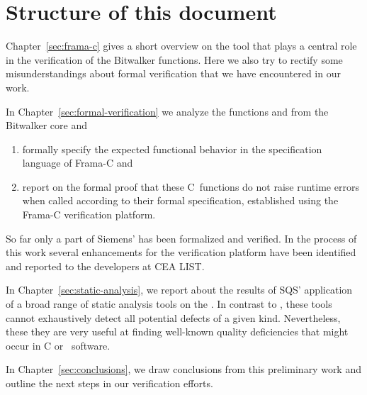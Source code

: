 \section{Structure of this document}

Chapter~\ref{sec:frama-c} gives a short overview on the \framacwp tool
that plays a central role in the verification of the Bitwalker functions.
Here we also try to rectify some misunderstandings about formal verification
that we have encountered in our work.

In Chapter~\ref{sec:formal-verification} we analyze
the functions \peek and \poke from the Bitwalker core and
\begin{enumerate}
\item formally specify the
      expected functional behavior in the \acsl specification language of {Frama-C}
      and
\item report on the formal proof 
	that these
      C~functions do not raise runtime errors when called according to their
      formal specification, established using 
      the {Frama-C} verification platform.
\end{enumerate}

So far only a part of Siemens' \bitwalker has been formalized and verified.
In the process of this work several enhancements for the \framac verification platform
have been identified and reported to the developers at {CEA LIST}.

In Chapter~\ref{sec:static-analysis}, we report about the results of
SQS' application of a broad range of static analysis tools on the \bitwalker. 
In contrast to \framac, these tools cannot exhaustively
detect all potential defects of a given kind.
Nevertheless, these they are very useful at finding well-known quality deficiencies that
might occur in C or \CC\ software.

In Chapter~\ref{sec:conclusions}, we draw conclusions from this preliminary work
and outline the next steps in our verification efforts.


